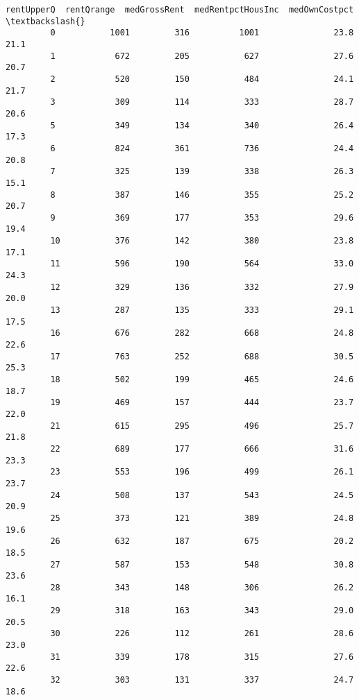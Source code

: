 \documentclass[11pt]{llncs}
\begin{document}
\begin{Verbatim}[commandchars=\\\{\}]
               rentUpperQ  rentQrange  medGrossRent  medRentpctHousInc  medOwnCostpct  \textbackslash{}
         0           1001         316          1001               23.8           21.1   
         1            672         205           627               27.6           20.7   
         2            520         150           484               24.1           21.7   
         3            309         114           333               28.7           20.6   
         5            349         134           340               26.4           17.3   
         6            824         361           736               24.4           20.8   
         7            325         139           338               26.3           15.1   
         8            387         146           355               25.2           20.7   
         9            369         177           353               29.6           19.4   
         10           376         142           380               23.8           17.1   
         11           596         190           564               33.0           24.3   
         12           329         136           332               27.9           20.0   
         13           287         135           333               29.1           17.5   
         16           676         282           668               24.8           22.6   
         17           763         252           688               30.5           25.3   
         18           502         199           465               24.6           18.7   
         19           469         157           444               23.7           22.0   
         21           615         295           496               25.7           21.8   
         22           689         177           666               31.6           23.3   
         23           553         196           499               26.1           23.7   
         24           508         137           543               24.5           20.9   
         25           373         121           389               24.8           19.6   
         26           632         187           675               20.2           18.5   
         27           587         153           548               30.8           23.6   
         28           343         148           306               26.2           16.1   
         29           318         163           343               29.0           20.5   
         30           226         112           261               28.6           23.0   
         31           339         178           315               27.6           22.6   
         32           303         131           337               24.7           18.6   

\end{Verbatim}
\end{document}
